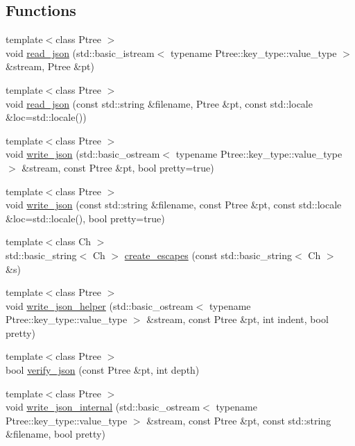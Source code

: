 \subsection*{Functions}
\begin{DoxyCompactItemize}
\item 
{\footnotesize template$<$class Ptree $>$ }\\void \hyperlink{namespaceboost_1_1property__tree_1_1json__parser_a7aed126d35d2893e51c49399ba33c51e}{read\-\_\-json} (std\-::basic\-\_\-istream$<$ typename Ptree\-::key\-\_\-type\-::value\-\_\-type $>$ \&stream, Ptree \&pt)
\item 
{\footnotesize template$<$class Ptree $>$ }\\void \hyperlink{namespaceboost_1_1property__tree_1_1json__parser_aa8344dc0b7987cba89b0630195d7a34d}{read\-\_\-json} (const std\-::string \&filename, Ptree \&pt, const std\-::locale \&loc=std\-::locale())
\item 
{\footnotesize template$<$class Ptree $>$ }\\void \hyperlink{namespaceboost_1_1property__tree_1_1json__parser_ad290247428581132003df8706e3ef9d0}{write\-\_\-json} (std\-::basic\-\_\-ostream$<$ typename Ptree\-::key\-\_\-type\-::value\-\_\-type $>$ \&stream, const Ptree \&pt, bool pretty=true)
\item 
{\footnotesize template$<$class Ptree $>$ }\\void \hyperlink{namespaceboost_1_1property__tree_1_1json__parser_a49f6a7c920e5ac943603a5f10ccf3a32}{write\-\_\-json} (const std\-::string \&filename, const Ptree \&pt, const std\-::locale \&loc=std\-::locale(), bool pretty=true)
\item 
{\footnotesize template$<$class Ch $>$ }\\std\-::basic\-\_\-string$<$ Ch $>$ \hyperlink{namespaceboost_1_1property__tree_1_1json__parser_a747e92e137769eb6b27edb76d613f37a}{create\-\_\-escapes} (const std\-::basic\-\_\-string$<$ Ch $>$ \&s)
\item 
{\footnotesize template$<$class Ptree $>$ }\\void \hyperlink{namespaceboost_1_1property__tree_1_1json__parser_a133973ddea67e6d77424312cd297b332}{write\-\_\-json\-\_\-helper} (std\-::basic\-\_\-ostream$<$ typename Ptree\-::key\-\_\-type\-::value\-\_\-type $>$ \&stream, const Ptree \&pt, int indent, bool pretty)
\item 
{\footnotesize template$<$class Ptree $>$ }\\bool \hyperlink{namespaceboost_1_1property__tree_1_1json__parser_ad1f43753e8e91845fdb1177c1aa0c465}{verify\-\_\-json} (const Ptree \&pt, int depth)
\item 
{\footnotesize template$<$class Ptree $>$ }\\void \hyperlink{namespaceboost_1_1property__tree_1_1json__parser_af1059520397d396ae91e776391a2f32b}{write\-\_\-json\-\_\-internal} (std\-::basic\-\_\-ostream$<$ typename Ptree\-::key\-\_\-type\-::value\-\_\-type $>$ \&stream, const Ptree \&pt, const std\-::string \&filename, bool pretty)
\end{DoxyCompactItemize}


